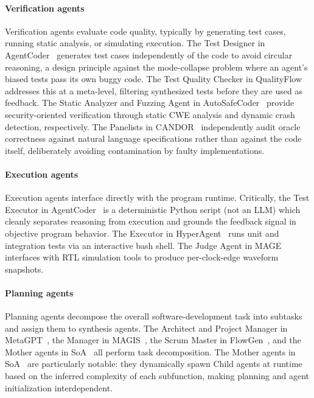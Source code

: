 \paragraph{Verification agents} Verification agents evaluate code
quality, typically by generating test cases, running static
analysis, or simulating execution. The Test Designer in
AgentCoder~\cite{huang2023agentcoder} generates test cases
independently of the code to avoid circular reasoning, a design
principle against the mode-collapse problem where an agent's
biased tests pass its own buggy code. The Test Quality Checker in
QualityFlow~\cite{Hu2025QualityFlow} addresses this at a
meta-level, filtering synthesized tests before they are used as
feedback. The Static Analyzer and Fuzzing Agent in
AutoSafeCoder~\cite{Nunez2024AutoSafeCoder} provide
security-oriented verification through static CWE analysis and
dynamic crash detection, respectively. The Panelists in
CANDOR~\cite{Xu2025Hallucination} independently audit oracle
correctness against natural language specifications rather than
against the code itself, deliberately avoiding contamination by
faulty implementations.

\paragraph{Execution agents} Execution agents interface directly
with the program runtime. Critically, the Test Executor in
AgentCoder~\cite{huang2023agentcoder} is a deterministic Python
script (not an LLM) which cleanly separates reasoning from
execution and grounds the feedback signal in objective program
behavior. The Executor in HyperAgent~\cite{Phan2024HyperAgent}
runs unit and integration tests via an interactive bash shell.
The Judge Agent in MAGE~\cite{Zhao2024MAGE} interfaces with RTL
simulation tools to produce per-clock-edge waveform snapshots.

\paragraph{Planning agents} Planning agents decompose the overall
software-development task into subtasks and assign them to
synthesis agents. The Architect and Project Manager in
MetaGPT~\cite{Hong2023MetaGPT}, the Manager in
MAGIS~\cite{Tao2024Magis}, the Scrum Master in
FlowGen~\cite{Lin2025Soen101}, and the Mother agents in
SoA~\cite{Ishibashi2024SelfOrganized} all perform task
decomposition. The Mother agents in
SoA~\cite{Ishibashi2024SelfOrganized} are particularly notable:
they dynamically spawn Child agents at runtime based on the
inferred complexity of each subfunction, making planning and
agent initialization interdependent.

